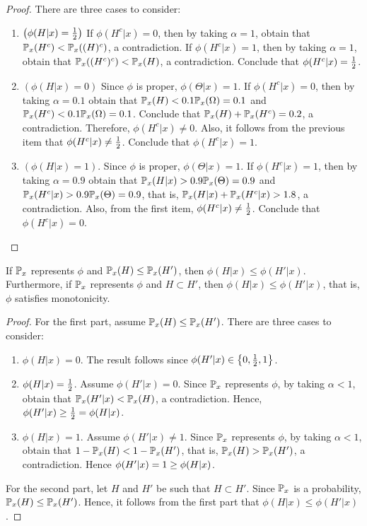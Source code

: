 \begin{proof}
 There are three cases to consider:
 \begin{enumerate}
  \item $\left(\phi(H|x) = \half\right)$
  If $\phi(H^c|x) = 0$, then
  by taking $\alpha = 1$, obtain that
  $\P_x(H^c) < \P_x((H)^c)$, a contradiction.
  If $\phi(H^c|x) = 1$, then
  by taking $\alpha = 1$, obtain that
  $\P_x((H^c)^c) < \P_x(H)$, a contradiction.
  Conclude that $\phi(H^c|x) = \half$.

  \item $\left(\phi(H|x) = 0\right)$
  Since $\phi$ is proper, $\phi(\Theta|x) = 1$.
  If $\phi(H^c|x) = 0$, then by
  taking $\alpha = 0.1$ obtain that
  $\P_x(H) < 0.1 \P_x(\Omega) = 0.1$ and
  $\P_x(H^c) < 0.1 \P_x(\Omega) = 0.1$.
  Conclude that 
  $\P_x(H) + \P_x(H^c) = 0.2$, a contradiction.
  Therefore, $\phi(H^c|x) \neq 0$.
  Also, it follows from the previous item that
  $\phi(H^c|x) \neq \half$.
  Conclude that $\phi(H^c|x) = 1$.
 
  \item $\left(\phi(H|x) = 1\right)$.
  Since $\phi$ is proper, $\phi(\Theta|x) = 1$.
  If $\phi(H^c|x) = 1$, then by taking
  $\alpha = 0.9$ obtain that
  $\P_x(H|x) > 0.9\P_x(\Theta) = 0.9$ and
  $\P_x(H^c|x) > 0.9\P_x(\Theta) = 0.9$, that is,
  $\P_x(H|x) + \P_x(H^c|x) > 1.8$, a contradiction.
  Also, from the first item,
  $\phi(H^c|x) \neq \half$. Conclude that
  $\phi(H^c|x) = 0$.
 \end{enumerate}
\end{proof}

\begin{lemma}
 \label{lemma:coherence-nonstd_2_2}
 If $\P_x$ represents $\phi$ and
 $\P_x(H) \leq \P_x(H')$, then
 $\phi(H|x) \leq \phi(H'|x)$.
 Furthermore, if $\P_x$ represents $\phi$ and
 $H \subset H'$, then
 $\phi(H|x) \leq \phi(H'|x)$, that is,
 $\phi$ satisfies monotonicity.
\end{lemma}

\begin{proof}
 For the first part,
 assume $\P_x(H) \leq \P_x(H')$.
 There are three cases to consider:
 \begin{enumerate}
  \item $\phi(H|x) = 0$.  
  The result follows since
  $\phi(H'|x) \in \left\{0,\half,1\right\}$.

  \item $\phi(H|x) = \half$.
  Assume $\phi(H'|x) = 0$. Since
  $\P_x$ represents $\phi$,
  by taking $\alpha < 1$, obtain that
  $\P_x(H'|x) < \P_x(H)$, a contradiction.
  Hence, $\phi(H'|x) \geq \half = \phi(H|x)$.

  \item $\phi(H|x) = 1$.
  Assume $\phi(H'|x) \neq 1$.
  Since $\P_x$ represents $\phi$,
  by taking $\alpha < 1$, obtain that
  $1 - \P_x(H) < 1 - \P_x(H')$, that is,
  $\P_x(H) > \P_x(H')$, a contradiction.
  Hence $\phi(H'|x) = 1 \geq \phi(H|\x)$.
 \end{enumerate}
 For the second part, 
 let $H$ and $H'$ be such that
 $H \subset H'$. 
 Since $\P_x$ is a probability, 
 $\P_x(H) \leq \P_x(H')$. Hence,
 it follows from 
 the first part that
 $\phi(H|x) \leq \phi(H'|x)$.
\end{proof}

